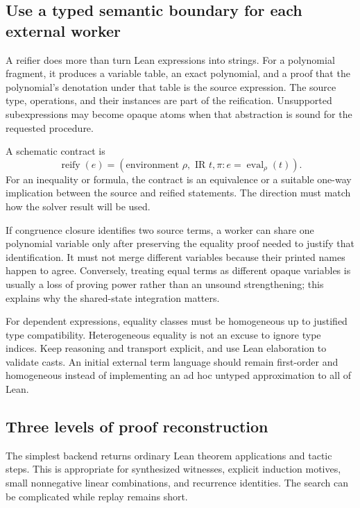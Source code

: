 \subsection{Use a typed semantic boundary for each external worker}

A reifier does more than turn Lean expressions into strings. For a polynomial
fragment, it produces a variable table, an exact polynomial, and a proof that
the polynomial's denotation under that table is the source expression. The
source type, operations, and their instances are part of the reification.
Unsupported subexpressions may become opaque atoms when that abstraction is
sound for the requested procedure.

A schematic contract is
\[
\operatorname{reify}(e)
  =(\text{environment }\rho,\text{ IR }t,
    \pi: e=\operatorname{eval}_{\rho}(t)).
\]
For an inequality or formula, the contract is an equivalence or a suitable
one-way implication between the source and reified statements. The direction
must match how the solver result will be used.

If congruence closure identifies two source terms, a worker can share one
polynomial variable only after preserving the equality proof needed to
justify that identification. It must not merge different variables because
their printed names happen to agree. Conversely, treating equal terms as
different opaque variables is usually a loss of proving power rather than
an unsound strengthening; this explains why the shared-state integration
matters.

For dependent expressions, equality classes must be homogeneous up to
justified type compatibility. Heterogeneous equality is not an excuse to
ignore type indices. Keep  reasoning and transport explicit, and
use Lean elaboration to validate casts. An initial external term language
should remain first-order and homogeneous instead of implementing an ad hoc
untyped approximation to all of Lean.

\subsection{Three levels of proof reconstruction}

The simplest backend returns ordinary Lean theorem applications and tactic
steps. This is appropriate for synthesized witnesses, explicit induction
motives, small nonnegative linear combinations, and recurrence identities.
The search can be complicated while replay remains short.

